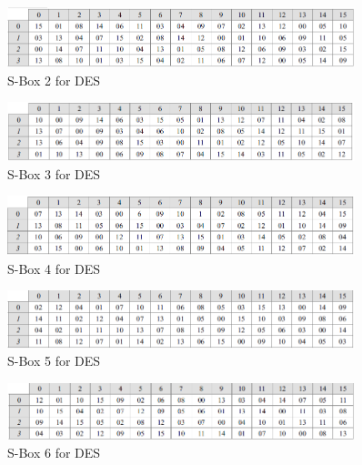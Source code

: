\documentclass[a4paper]{report} %
\begin{document}
\begin{enumerate}
\begin{enumerate}
\begin{itemize}
        \begin{figure}
        \centering
        \includegraphics[width=0.9\textwidth]{images/SBox12_DES.PNG}
        \caption{S-Box 2 for DES}
        \end{figure}
        
         \begin{figure}
        \centering
        \includegraphics[width=0.9\textwidth]{images/SBox3_DES.PNG}
        \caption{S-Box 3 for DES}
        \end{figure}
        
         \begin{figure}
        \centering
        \includegraphics[width=0.9\textwidth]{images/SBox4_DES.PNG}
        \caption{S-Box 4 for DES}
        \end{figure}
         
         \begin{figure}
        \centering
        \includegraphics[width=0.9\textwidth]{images/SBox5_DES.PNG}
        \caption{S-Box 5 for DES}
        \end{figure}
        
         \begin{figure}
        \centering
        \includegraphics[width=0.9\textwidth]{images/SBox6_DES.PNG}
        \caption{S-Box 6 for DES}
        \end{figure}
        

\end{itemize}
\end{enumerate}
\end{enumerate}
\end{document}
